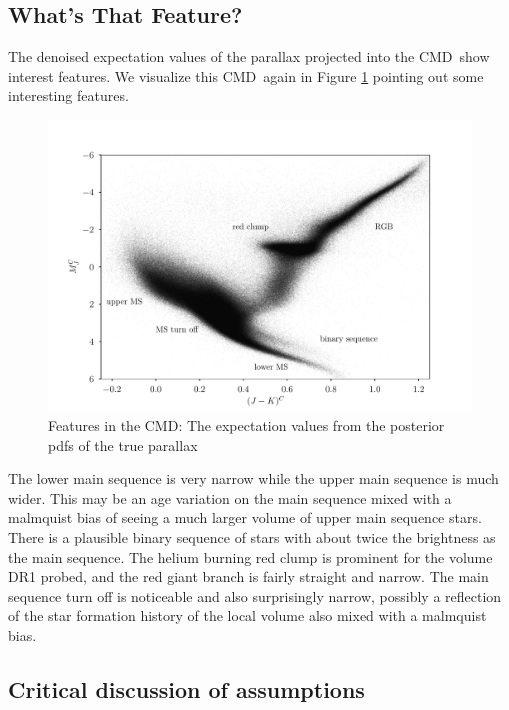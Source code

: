 \documentclass[modern]{aastex61}
\newcommand{\acronym}[1]{{\small{#1}}}
\newcommand{\cmd}{\acronym{CMD}}
\begin{document}
\subsection{What's That Feature?}
The denoised expectation values of the parallax projected into the \cmd\ show interest features.
We visualize this \cmd\ again in Figure \ref{fig:wtf} pointing out some interesting features.
\begin{figure}
\centering
  \includegraphics[width=\textwidth]{whatsThatFeature.pdf}
\caption{Features in the \cmd: The expectation values from the posterior pdfs of the true parallax}
\label{fig:wtf}
\end{figure}

The lower main sequence is very narrow while the upper main sequence
is much wider. This may be an age variation on the main sequence mixed
with a malmquist bias of seeing a much larger volume of upper main
sequence stars. There is a plausible binary sequence of stars with
about twice the brightness as the main sequence. The helium burning
red clump is prominent for the volume DR1 probed, and the red giant
branch is fairly straight and narrow. The main sequence turn off is
noticeable and also surprisingly narrow, possibly a reflection of the
star formation history of the local volume also mixed with a malmquist
bias.

\subsection{Critical discussion of assumptions}
\end{document}
